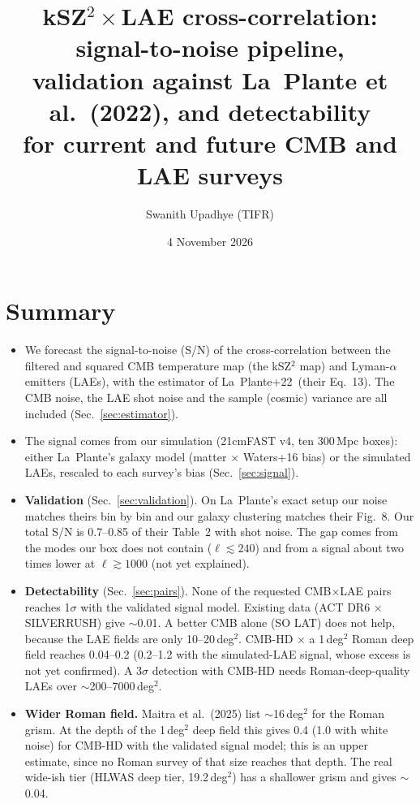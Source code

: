 \documentclass[11pt]{article}
\title{kSZ$^2\times$LAE cross-correlation: signal-to-noise pipeline,\\ validation against La~Plante et al.\ (2022), and detectability\\ for current and future CMB and LAE surveys}
\author{Swanith Upadhye (TIFR)}
\date{4 November 2026}
\newcommand{\LP}{La~Plante+22}
\begin{document}
\maketitle

\section*{Summary}
\begin{itemize}
\item We forecast the signal-to-noise (S/N) of the cross-correlation between the filtered and squared CMB temperature map (the kSZ$^2$ map) and Lyman-$\alpha$ emitters (LAEs), with the estimator of \LP\ (their Eq.~13). The CMB noise, the LAE shot noise and the sample (cosmic) variance are all included (Sec.~\ref{sec:estimator}).
\item The signal comes from our simulation (21cmFAST v4, ten 300\,Mpc boxes): either La~Plante's galaxy model (matter $\times$ Waters+16 bias) or the simulated LAEs, rescaled to each survey's bias (Sec.~\ref{sec:signal}).
\item \textbf{Validation} (Sec.~\ref{sec:validation}). On La~Plante's exact setup our noise matches theirs bin by bin and our galaxy clustering matches their Fig.~8. Our total S/N is 0.7--0.85 of their Table~2 with shot noise. The gap comes from the modes our box does not contain ($\ell \lesssim 240$) and from a signal about two times lower at $\ell\gtrsim1000$ (not yet explained).
\item \textbf{Detectability} (Sec.~\ref{sec:pairs}). None of the requested CMB$\times$LAE pairs reaches 1$\sigma$ with the validated signal model. Existing data (ACT DR6 $\times$ SILVERRUSH) give $\sim$0.01. A better CMB alone (SO LAT) does not help, because the LAE fields are only 10--20\,deg$^2$. CMB-HD $\times$ a 1\,deg$^2$ Roman deep field reaches 0.04--0.2 (0.2--1.2 with the simulated-LAE signal, whose excess is not yet confirmed). A 3$\sigma$ detection with CMB-HD needs Roman-deep-quality LAEs over $\sim$200--7000\,deg$^2$.
\item \textbf{Wider Roman field.} Maitra et al.\ (2025) list $\sim$16\,deg$^2$ for the Roman grism. At the depth of the 1\,deg$^2$ deep field this gives 0.4 (1.0 with white noise) for CMB-HD with the validated signal model; this is an upper estimate, since no Roman survey of that size reaches that depth. The real wide-ish tier (HLWAS deep tier, 19.2\,deg$^2$) has a shallower grism and gives $\sim$0.04.
\end{itemize}
\end{document}
